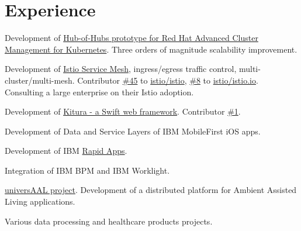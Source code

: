 \documentclass[]{deedy-resume}
\begin{document}
\hfill
\begin{minipage}[t]{0.66\textwidth}


\section{Experience}

\vspace{\topsep} %
\begin{tightemize}
\item Development of \href{https://github.com/stolostron/hub-of-hubs}{Hub-of-Hubs prototype for Red Hat Advanced Cluster Management for Kubernetes}. Three orders of magnitude scalability improvement.
\item Development of \href{https://istio.io}{Istio Service Mesh}, ingress/egress traffic control, multi-cluster/multi-mesh.
Contributor \href{https://github.com/istio/istio/graphs/contributors}{\#45} to \href{https://github.com/istio/istio}{istio/istio}, \href{https://github.com/istio/istio.io/graphs/contributors}{\#8} to \href{https://github.com/istio/istio.io}{istio/istio.io}. Consulting a large enterprise on their Istio adoption.
\item Development of \href{https://github.com/Kitura/Kitura}{Kitura - a Swift web framework}. Contributor \href{https://github.com/IBM-Swift/Kitura/graphs/contributors}{\#1}.
\item Development of Data and Service Layers of IBM MobileFirst iOS apps.
\item Development of IBM \href{https://heidloff.net/article/ibm-announces-citizen-developer-tool-to-build-situational-apps-bluemix-rapidapps/}{Rapid Apps}.
\item Integration of IBM BPM and IBM Worklight.
\end{tightemize}
\sectionsep

\vspace{\topsep} %
\begin{tightemize}
\item \href{https://cordis.europa.eu/project/id/247950}{universAAL project}. Development of a distributed platform for Ambient Assisted Living applications.
\item Various data processing and healthcare products projects.
\end{tightemize}
\sectionsep


\end{minipage}
\end{document}
